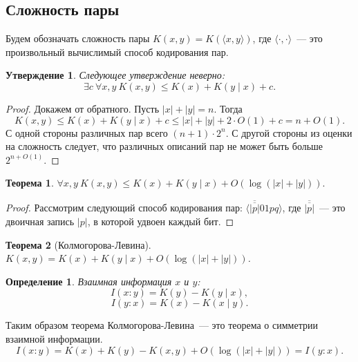 \documentclass[12pt]{article}
\theoremstyle{definition}
\newtheorem{definition}{Определение}
\theoremstyle{plain}
\newtheorem{theorem}{Теорема}[section]
\newtheorem{statement}{Утверждение}[section]
\theoremstyle{remark}
\begin{document}
\subsection{Сложность пары}
Будем обозначать сложность пары $K(x,y) = K(\langle x,y\rangle)$, где
$\langle\cdot,\cdot\rangle$~--- это произвольный вычислимый способ кодирования
пар.
\begin{statement}
    Следующее утверждение \emph{неверно}:
    \[
        \exists c\ \forall x,y\ K(x,y) \le K(x) + K(y\mid x) + c.
    \]
\end{statement}
\begin{proof}
    Докажем от обратного. Пусть $|x| + |y| = n$. Тогда 
    \[
    K(x,y)\le K(x) + K(y \mid x) + c \le |x| + |y| + 2\cdot O(1) + c = n + O(1).
    \]   
    С одной стороны различных пар всего $(n+1)\cdot 2^n$. С
    другой стороны из оценки на сложность следует, что различных описаний пар
    не может быть больше $2^{n + O(1)}$.
\end{proof}  
\begin{theorem}
    \(
        \forall x,y\ K(x,y) \le K(x) + K(y\mid x) + O(\log(|x| + |y|)).
    \)
\end{theorem}
\begin{proof}
    Рассмотрим следующий способ кодирования пар: $\langle
    \overline{\overline{|p|}}01pq\rangle$, где $\overline{\overline{|p|}}$~--- это
    двоичная запись $|p|$, в которой удвоен каждый бит.
\end{proof}
\begin{theorem}[Колмогорова-Левина]\label{thm:kolmogorov-levin}
    $K(x,y) = K(x) + K(y\mid x) + O(\log(|x| + |y|))$.
\end{theorem}
\begin{definition}
    \emph{Взаимная информация $x$ и $y$:}
    \[
        I(x:y) = K(y) - K(y\mid x),
    \]\[
        I(y:x) = K(x) - K(x\mid y).
    \]
\end{definition}
Таким образом теорема Колмогорова-Левина~--- это теорема о симметрии взаимной
информации.
    \[
        I(x:y) = K(x) + K(y) - K(x,y) + O(\log(|x| + |y|)) =  I(y:x).
    \]
\end{document}
